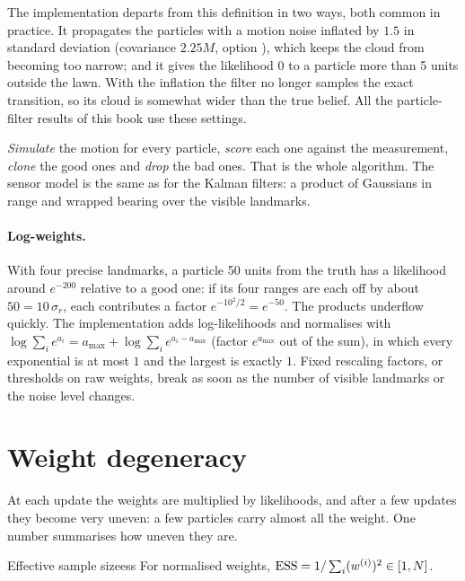 The implementation departs from this definition in two ways, both common
in practice. It propagates the particles with a motion noise inflated by
$1.5$ in standard deviation (covariance $2.25M$, option
), which keeps the cloud from becoming too
narrow; and it gives the likelihood $0$ to a particle more than 5 units
outside the lawn. With the inflation the filter no longer samples the
exact transition, so its cloud is somewhat wider than the true belief.
All the particle-filter results of this book use these settings.

\begin{inwords}
\emph{Simulate} the motion for every particle, \emph{score} each one
against the measurement, \emph{clone} the good ones and \emph{drop} the
bad ones. That is the whole algorithm. The sensor model is the same as for
the Kalman filters: a product of Gaussians in range and wrapped bearing
over the visible landmarks.
\end{inwords}

\paragraph{Log-weights.} With four precise landmarks, a particle 50 units
from the truth has a likelihood around $e^{-200}$ relative to a good one:
if its four ranges are each off by about $50=10\,\sigma_r$, each
contributes a factor $e^{-10^2/2}=e^{-50}$. The products underflow
quickly. The implementation adds log-likelihoods and normalises with
$\log\sum_ie^{a_i}=a_{\max}+\log\sum_ie^{a_i-a_{\max}}$ (factor
$e^{a_{\max}}$ out of the sum), in which every exponential is at most
$1$ and the largest is exactly $1$. Fixed rescaling factors, or thresholds on raw
weights, break as soon as the number of visible landmarks or the noise
level changes.

\section{Weight degeneracy}

At each update the weights are multiplied by likelihoods, and after a few
updates they become very uneven: a few particles carry almost all the
weight. One number summarises how uneven they are.

\begin{definition}{Effective sample size}{ess}
For normalised weights, $\operatorname{ESS}=1/\sum_i(w^{(i)})^2\in[1,N]$.
\end{definition}

